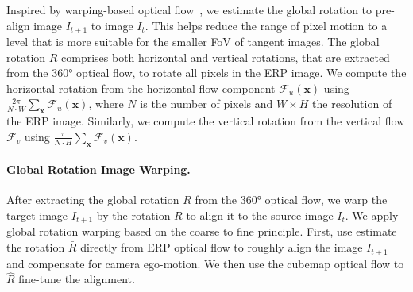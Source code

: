 
Inspired by warping-based optical flow~\cite{BroxBPW2004}, we estimate the global rotation to pre-align image $I_{t+1}$ to image $I_{t}$.
This helps reduce the range of pixel motion to a level that is more suitable for the smaller FoV of tangent images.
%
The global rotation $R$ comprises both horizontal and vertical rotations, that are extracted from the 360° optical flow, to rotate all pixels in the ERP image.
%
We compute the horizontal rotation from the horizontal flow component $\mathcal{F}_u(\mathbf{x})$ using $\frac{2\pi}{N\cdot W}\sum_\mathbf{x}\mathcal{F}_u(\mathbf{x})$, where $N$ is the number of pixels and $W \!\times\! H$ the resolution of the ERP image.
%
Similarly, we compute the vertical rotation from the vertical flow $\mathcal{F}_v$ using $\frac{\pi}{N \cdot H}\sum_\mathbf{x}\mathcal{F}_v(\mathbf{x})$.


\paragraph{Global Rotation Image Warping.}
After extracting  the global rotation $R$ from the 360° optical flow, we warp the target image $I_{t+1}$ by the rotation $R$ to align it to the source image $I_{t}$. %
%
We apply global rotation warping based on the coarse to fine principle.
First, use estimate the rotation $\bar{R}$ directly from ERP optical flow to roughly align the image $I_{t+1}$ and compensate for camera ego-motion.
We then use the cubemap optical flow to  $\hat{R}$  fine-tune the  alignment.


